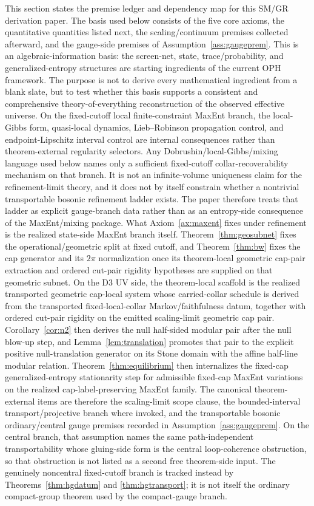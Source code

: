 \documentclass[11pt]{article}
\begin{document}
This section states the premise ledger and dependency map for this SM/GR derivation paper. The basis used below consists of the five core axioms, the quantitative quantities listed next, the scaling/continuum premises collected afterward, and the gauge-side premises of Assumption~\ref{ass:gaugeprem}. This is an algebraic-information basis: the screen-net, state, trace/probability, and generalized-entropy structures are starting ingredients of the current OPH framework. The purpose is not to derive every mathematical ingredient from a blank slate, but to test whether this basis supports a consistent and comprehensive theory-of-everything reconstruction of the observed effective universe. On the fixed-cutoff local finite-constraint MaxEnt branch, the local-Gibbs form, quasi-local dynamics, Lieb--Robinson propagation control, and endpoint-Lipschitz interval control are internal consequences rather than theorem-external regularity selectors. Any Dobrushin/local-Gibbs/mixing language used below names only a sufficient fixed-cutoff collar-recoverability mechanism on that branch. It is not an infinite-volume uniqueness claim for the refinement-limit theory, and it does not by itself constrain whether a nontrivial transportable bosonic refinement ladder exists. The paper therefore treats that ladder as explicit gauge-branch data rather than as an entropy-side consequence of the MaxEnt/mixing package. What Axiom~\ref{ax:maxent} fixes under refinement is the realized state-side MaxEnt branch itself. Theorem~\ref{thm:geosubnet} fixes the operational/geometric split at fixed cutoff, and Theorem~\ref{thm:bw} fixes the cap generator and its \(2\pi\) normalization once its theorem-local geometric cap-pair extraction and ordered cut-pair rigidity hypotheses are supplied on that geometric subnet. On the D3 UV side, the theorem-local scaffold is the realized transported geometric cap-local system whose carried-collar schedule is derived from the transported fixed-local-collar Markov/faithfulness datum, together with ordered cut-pair rigidity on the emitted scaling-limit geometric cap pair. Corollary~\ref{cor:n2} then derives the null half-sided modular pair after the null blow-up step, and Lemma~\ref{lem:translation} promotes that pair to the explicit positive null-translation generator on its Stone domain with the affine half-line modular relation. Theorem~\ref{thm:equilibrium} then internalizes the fixed-cap generalized-entropy stationarity step for admissible fixed-cap MaxEnt variations on the realized cap-label-preserving MaxEnt family. The canonical theorem-external items are therefore the scaling-limit scope clause, the bounded-interval transport/projective branch where invoked, and the transportable bosonic ordinary/central gauge premises recorded in Assumption~\ref{ass:gaugeprem}. On the central branch, that assumption names the same path-independent transportability whose gluing-side form is the central loop-coherence obstruction, so that obstruction is not listed as a second free theorem-side input. The genuinely noncentral fixed-cutoff branch is tracked instead by Theorems~\ref{thm:hgdatum} and \ref{thm:hgtransport}; it is not itself the ordinary compact-group theorem used by the compact-gauge branch.
\end{document}
